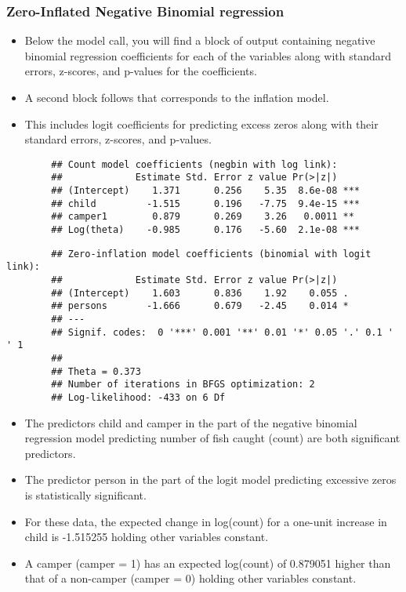 \documentclass[MASTER.tex]{subfiles}
\begin{document}
\begin{frame}[fragile]
\frametitle{Zero-Inflated Negative Binomial regression}	
\large
	\begin{itemize}	
		\item Below the model call, you will find a block of output containing negative binomial regression coefficients for each of the variables along with standard errors, z-scores, and p-values for the coefficients. 
		\item A second block follows that corresponds to the inflation model. 
		\item This includes logit coefficients for predicting excess zeros along with their standard errors, z-scores, and p-values.
	\end{itemize}
\end{frame}
\begin{frame}[fragile]
	\begin{verbatim}
		## Count model coefficients (negbin with log link):
		##             Estimate Std. Error z value Pr(>|z|)    
		## (Intercept)    1.371      0.256    5.35  8.6e-08 ***
		## child         -1.515      0.196   -7.75  9.4e-15 ***
		## camper1        0.879      0.269    3.26   0.0011 ** 
		## Log(theta)    -0.985      0.176   -5.60  2.1e-08 ***
\end{verbatim}
\end{frame}
\begin{frame}[fragile]
	\begin{verbatim}
		## Zero-inflation model coefficients (binomial with logit link):
		##             Estimate Std. Error z value Pr(>|z|)  
		## (Intercept)    1.603      0.836    1.92    0.055 .
		## persons       -1.666      0.679   -2.45    0.014 *
		## ---
		## Signif. codes:  0 '***' 0.001 '**' 0.01 '*' 0.05 '.' 0.1 ' ' 1 
		## 
		## Theta = 0.373 
		## Number of iterations in BFGS optimization: 2 
		## Log-likelihood: -433 on 6 Df
\end{verbatim}
\end{frame}
\begin{frame}
	\begin{itemize}
		\item The predictors child and camper in the part of the negative binomial regression model predicting number of fish caught (count) are both significant predictors.
		\item The predictor person in the part of the logit model predicting excessive zeros is statistically significant.
		\item For these data, the expected change in log(count) for a one-unit increase in child is -1.515255 holding other variables constant. 
		\item A camper (camper = 1) has an expected log(count) of 0.879051 higher than that of a non-camper (camper = 0) holding other variables constant.
	\end{itemize}
\end{frame}
\end{document}
